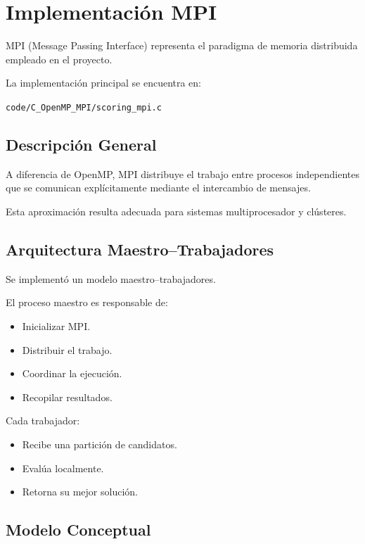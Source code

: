 \chapter{Implementación MPI}

MPI (Message Passing Interface) representa el paradigma de memoria distribuida empleado en el proyecto.

La implementación principal se encuentra en:

\begin{center}
\texttt{code/C\_OpenMP\_MPI/scoring\_mpi.c}
\end{center}

\section{Descripción General}

A diferencia de OpenMP, MPI distribuye el trabajo entre procesos independientes que se comunican explícitamente mediante el intercambio de mensajes.

Esta aproximación resulta adecuada para sistemas multiprocesador y clústeres.

\section{Arquitectura Maestro--Trabajadores}

Se implementó un modelo maestro--trabajadores.

El proceso maestro es responsable de:

\begin{itemize}
    \item Inicializar MPI.
    \item Distribuir el trabajo.
    \item Coordinar la ejecución.
    \item Recopilar resultados.
\end{itemize}

Cada trabajador:

\begin{itemize}
    \item Recibe una partición de candidatos.
    \item Evalúa localmente.
    \item Retorna su mejor solución.
\end{itemize}

\section{Modelo Conceptual}

